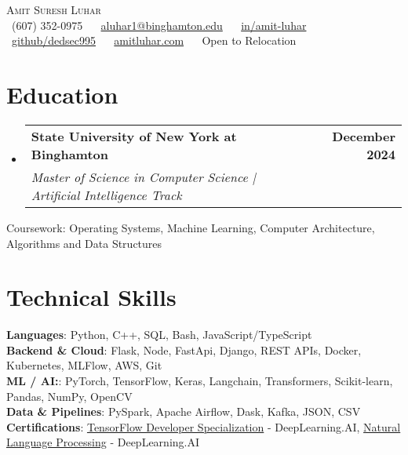 \documentclass[letterpaper,8pt]{article}
\makeatletter
\newcommand{\resumeSubheading}[4]{
  \vspace{-2pt}\item
    \begin{tabular*}{1.0\textwidth}[t]{l@{\extracolsep{\fill}}r}
      \textbf{#1} & \textbf{\small #2} \\
      \textit{\small#3} & \textit{\small #4} \\
    \end{tabular*}\vspace{-7pt}
}
\newcommand{\resumeSubHeadingListStart}{\begin{itemize}[leftmargin=0.0in, label={}]}
\newcommand{\resumeSubHeadingListEnd}{\end{itemize}}\vspace{0pt}
\makeatother
\begin{document}

\begin{center}
    {\huge \scshape Amit Suresh Luhar} \\[2mm]
    \small \raisebox{-0.1\height}
    \faPhone\ (607) 352-0975 ~ 
    {\faEnvelope\  \href{mailto:aluhar1@binghamton.edu}{aluhar1@binghamton.edu}} ~ 
    {\faLinkedin\ \href{https://www.linkedin.com/in/amit-luhar/}{in/amit-luhar}}  ~
    {\faGithub\ \href{https://github.com/dedsec995}{github/dedsec995}} ~
    {\faBriefcase\ \href{https://amitluhar.com/}{amitluhar.com}} ~
    {\faGlobe\ {Open to Relocation}}
    \vspace{-5pt}
\end{center}

\section{Education}
  \resumeSubHeadingListStart
    \resumeSubheading
    {State University of New York at Binghamton}{December 2024}
    {Master of Science in Computer Science | Artificial Intelligence Track}{}
  \resumeSubHeadingListEnd
  \vspace{-4pt}
  Coursework: Operating Systems, Machine Learning, Computer Architecture, Algorithms and Data Structures \vspace{-4pt}
  \vspace{-4pt}

\section{Technical Skills}
  \vspace{-1pt}
  \begin{itemize}[leftmargin=0.0in, label={}]
    \small{\item{   
    \textbf{Languages}{: Python, C++, SQL, Bash, JavaScript/TypeScript} \\[1mm]
    \textbf{Backend \& Cloud}{: Flask, Node, FastApi, Django, REST APIs, Docker, Kubernetes, MLFlow, AWS, Git} \\[1mm]
    \textbf{ML / AI:}{: PyTorch, TensorFlow, Keras, Langchain, Transformers, Scikit-learn, Pandas, NumPy, OpenCV} \\ [1mm]
    \textbf{Data \& Pipelines}{: PySpark, Apache Airflow, Dask, Kafka, JSON, CSV} \\ [1mm]
    \textbf{Certifications}{: \href{https://www.coursera.org/account/accomplishments/specialization/certificate/YW8U4922JT6N}{TensorFlow Developer Specialization} - DeepLearning.AI, \href{https://www.coursera.org/account/accomplishments/certificate/PXWY38Y7VJZB}{Natural Language Processing} - DeepLearning.AI } \\ [1mm]
    }}
  \end{itemize}
\vspace{-14pt}
\end{document}
